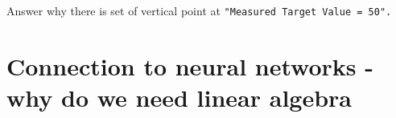 \documentclass[11pt]{article}
\begin{document}
Answer why there is set of vertical point at
\texttt{"Measured\ Target\ Value\ =\ 50".}

    \section{Connection to neural networks - why do we need linear
algebra}\label{connection-to-neural-networks---why-do-we-need-linear-algebra}


    
    
    
    
\end{document}
